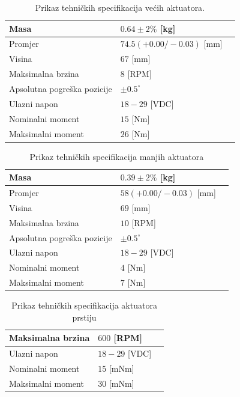\documentclass[times, utf8, diplomski, numeric]{fer}
\begin{document}
\begin{table}[h!]
    \centering
    \begin{tabular}{ | l | l | l |}
    \hline
    Masa & $0.64 \pm 2\%$ [kg] \\ \hline
    Promjer  & $74.5(+0.00/-0.03)$ [mm] \\ \hline
    Visina & $67$ [mm] \\ \hline
    Maksimalna brzina & $8$ [RPM] \\ \hline
    Apsolutna pogreška pozicije & $\pm0.5^{\circ}$ \\ \hline
    Ulazni napon  & $18 - 29$ [VDC] \\ \hline
    Nominalni moment & $15$ [Nm] \\ \hline
    Maksimalni moment & $26$  [Nm]  \\ \hline
    \end{tabular}
    \caption{Prikaz tehničkih specifikacija većih aktuatora.} \label{spec_act_big}
\end{table}

\begin{table}[h!]
    \centering
    \begin{tabular}{ | l | l | l |}
    \hline
    Masa & $0.39 \pm 2\%$ [kg] \\ \hline
    Promjer  & $58(+0.00/-0.03)$ [mm] \\ \hline
    Visina & $69$ [mm] \\ \hline
    Maksimalna brzina & $10$ [RPM] \\ \hline
    Apsolutna pogreška pozicije & $\pm0.5^{\circ}$ \\ \hline
    Ulazni napon  & $18 - 29$ [VDC] \\ \hline
    Nominalni moment & $4$ [Nm] \\ \hline
    Maksimalni moment & $7$  [Nm]  \\ \hline
    \end{tabular}
    \caption{Prikaz tehničkih specifikacija manjih aktuatora} \label{spec_act_small}
\end{table}

\begin{table}[h!]
    \centering
    \begin{tabular}{ | l | l | l |}
    \hline
    Maksimalna brzina & $600$ [RPM] \\ \hline
    Ulazni napon  & $18 - 29$ [VDC] \\ \hline
    Nominalni moment & $15$ [mNm] \\ \hline
    Maksimalni moment & $30$  [mNm]  \\ \hline
    \end{tabular}
    \caption{Prikaz tehničkih specifikacija aktuatora prstiju} \label{spec_act_finger}
\end{table}
\end{document}
